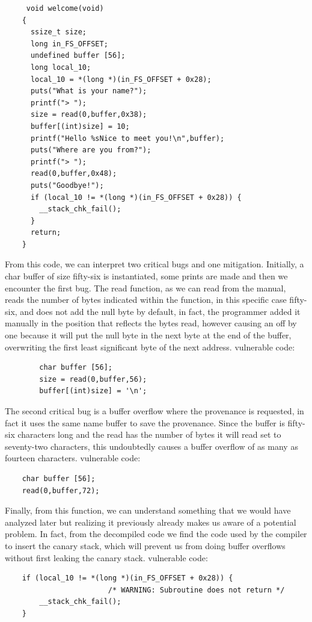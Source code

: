  \begin{verbatim}
     void welcome(void)
    {
      ssize_t size;
      long in_FS_OFFSET;
      undefined buffer [56];
      long local_10;
      local_10 = *(long *)(in_FS_OFFSET + 0x28);
      puts("What is your name?");
      printf("> ");
      size = read(0,buffer,0x38);
      buffer[(int)size] = 10;
      printf("Hello %sNice to meet you!\n",buffer);
      puts("Where are you from?");
      printf("> ");
      read(0,buffer,0x48);
      puts("Goodbye!");
      if (local_10 != *(long *)(in_FS_OFFSET + 0x28)) {
        __stack_chk_fail();
      }
      return;
    }
 \end{verbatim}
        From this code, we can interpret two critical bugs and one mitigation.\newline
    Initially, a char buffer of size fifty-six is instantiated, some prints are made and then we encounter the first bug.\newline
    The read function, as we can read from the manual, reads the number of bytes indicated within the function, in this specific case fifty-six, and does not add the null byte by default, in fact, the programmer added it manually in the position that reflects the bytes read, however causing an off by one because it will put the null byte in the next byte at the end of the buffer, overwriting the first least significant byte of the next address.\newline
    vulnerable code:\newline
    \begin{verbatim} 
        char buffer [56];
        size = read(0,buffer,56);  
        buffer[(int)size] = '\n';
    \end{verbatim}
    The second critical bug is a buffer overflow where the provenance is requested, in fact it uses the same name buffer to save the provenance.
    Since the buffer is fifty-six characters long and the read has the number of bytes it will read set to seventy-two characters, this undoubtedly causes a buffer overflow of as many as fourteen characters.
    vulnerable code:\newline
    \begin{verbatim} 
    char buffer [56];
    read(0,buffer,72);
    \end{verbatim}
    Finally, from this function, we can understand something that we would have analyzed later but realizing it previously already makes us aware of a potential problem.\newline
    In fact, from the decompiled code we find the code used by the compiler to insert the canary stack, which will prevent us from doing buffer overflows without first leaking the canary stack.\newline
    vulnerable code:
    \begin{verbatim} 
    if (local_10 != *(long *)(in_FS_OFFSET + 0x28)) {
                        /* WARNING: Subroutine does not return */
        __stack_chk_fail();
    }
    \end{verbatim}
    
